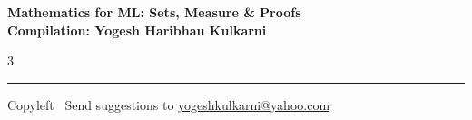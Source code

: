 \documentclass[8pt,landscape]{article}
\begin{document}
\footnotesize


\begin{center}
\Large{\textbf{Mathematics for ML: Sets, Measure \& Proofs\\ Compilation: Yogesh Haribhau Kulkarni}}
\end{center}

\begin{multicols}{3}

\end{multicols}

\rule{\linewidth}{0.25pt}
\scriptsize
Copyleft \textcopyleft\  Send suggestions to
\href{http://www.yogeshkulkarni.com}{yogeshkulkarni@yahoo.com}
\end{document}
